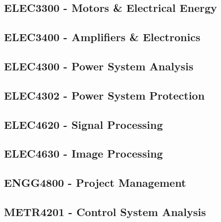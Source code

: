 \subsection{ELEC3300 - Motors \& Electrical Energy}
\clearpage

\subsection{ELEC3400 - Amplifiers \& Electronics}
\clearpage

\subsection{ELEC4300 - Power System Analysis}
\clearpage

\subsection{ELEC4302 - Power System Protection}
\clearpage

\subsection{ELEC4620 - Signal Processing}
\clearpage

\subsection{ELEC4630 - Image Processing}
\clearpage

\subsection{ENGG4800 - Project Management}
\clearpage

\subsection{METR4201 - Control System Analysis}
\clearpage





